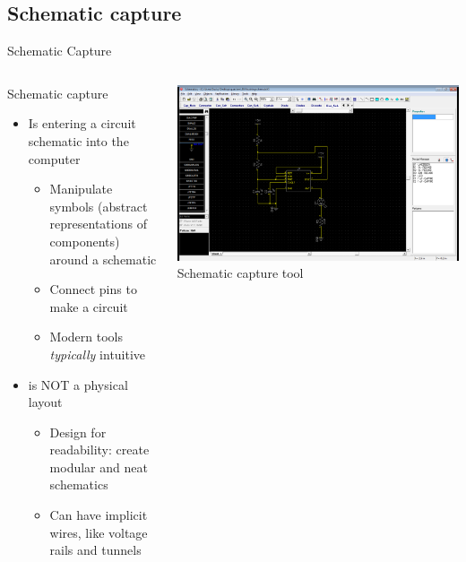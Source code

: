 \documentclass{beamer}
\begin{document}
\subsection{Schematic capture}
\begin{frame}{Schematic Capture}
  \begin{columns}[T]
    \begin{column}{.6\textwidth}
      Schematic capture
      \begin{itemize}
        \item Is entering a circuit schematic into the computer
        \begin{itemize}
          \item Manipulate symbols (abstract representations of components) around a schematic
          \item Connect pins to make a circuit
          \item Modern tools {\em typically} intuitive
        \end{itemize}
        \item is NOT a physical layout
        \begin{itemize}
          \item Design for readability: create modular and neat schematics
          \item Can have implicit wires, like voltage rails and tunnels
        \end{itemize}
      \end{itemize}
    \end{column}

    \begin{column}{0.4\textwidth} \centering
      \includegraphics[width=0.9\columnwidth]{../images/diptrace/555_schematic} \\
      Schematic capture tool
    \end{column}
  \end{columns}
\end{frame}
\end{document}
